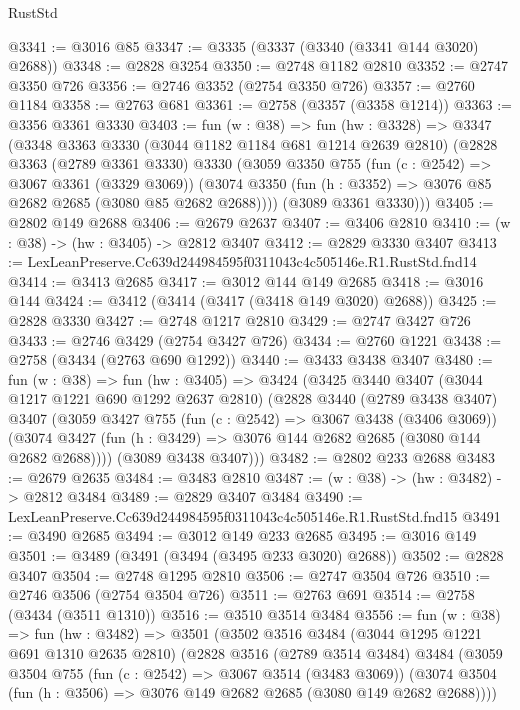 \begin{lexlean}{RustStd}
\begin{coremodule}
@3341 := @3016 @85
@3347 := @3335 (@3337 (@3340 (@3341 @144 @3020) @2688))
@3348 := @2828 @3254
@3350 := @2748 @1182 @2810
@3352 := @2747 @3350 @726
@3356 := @2746 @3352 (@2754 @3350 @726)
@3357 := @2760 @1184
@3358 := @2763 @681
@3361 := @2758 (@3357 (@3358 @1214))
@3363 := @3356 @3361 @3330
@3403 := fun (w : @38) =>
  fun (hw : @3328) =>
  @3347
    (@3348
      @3363
      @3330
      (@3044 @1182 @1184 @681 @1214 @2639 @2810)
      (@2828
        @3363
        (@2789 @3361 @3330)
        @3330
        (@3059
          @3350
          @755
          (fun (c : @2542) => @3067 @3361 (@3329 @3069))
          (@3074 @3350 (fun (h : @3352) => @3076 @85 @2682 @2685 (@3080 @85 @2682 @2688))))
        (@3089 @3361 @3330)))
@3405 := @2802 @149 @2688
@3406 := @2679 @2637
@3407 := @3406 @2810
@3410 := (w : @38) -> (hw : @3405) -> @2812 @3407
@3412 := @2829 @3330 @3407
@3413 := LexLeanPreserve.Cc639d244984595f0311043c4c505146e.R1.RustStd.fnd14
@3414 := @3413 @2685
@3417 := @3012 @144 @149 @2685
@3418 := @3016 @144
@3424 := @3412 (@3414 (@3417 (@3418 @149 @3020) @2688))
@3425 := @2828 @3330
@3427 := @2748 @1217 @2810
@3429 := @2747 @3427 @726
@3433 := @2746 @3429 (@2754 @3427 @726)
@3434 := @2760 @1221
@3438 := @2758 (@3434 (@2763 @690 @1292))
@3440 := @3433 @3438 @3407
@3480 := fun (w : @38) =>
  fun (hw : @3405) =>
  @3424
    (@3425
      @3440
      @3407
      (@3044 @1217 @1221 @690 @1292 @2637 @2810)
      (@2828
        @3440
        (@2789 @3438 @3407)
        @3407
        (@3059
          @3427
          @755
          (fun (c : @2542) => @3067 @3438 (@3406 @3069))
          (@3074 @3427 (fun (h : @3429) => @3076 @144 @2682 @2685 (@3080 @144 @2682 @2688))))
        (@3089 @3438 @3407)))
@3482 := @2802 @233 @2688
@3483 := @2679 @2635
@3484 := @3483 @2810
@3487 := (w : @38) -> (hw : @3482) -> @2812 @3484
@3489 := @2829 @3407 @3484
@3490 := LexLeanPreserve.Cc639d244984595f0311043c4c505146e.R1.RustStd.fnd15
@3491 := @3490 @2685
@3494 := @3012 @149 @233 @2685
@3495 := @3016 @149
@3501 := @3489 (@3491 (@3494 (@3495 @233 @3020) @2688))
@3502 := @2828 @3407
@3504 := @2748 @1295 @2810
@3506 := @2747 @3504 @726
@3510 := @2746 @3506 (@2754 @3504 @726)
@3511 := @2763 @691
@3514 := @2758 (@3434 (@3511 @1310))
@3516 := @3510 @3514 @3484
@3556 := fun (w : @38) =>
  fun (hw : @3482) =>
  @3501
    (@3502
      @3516
      @3484
      (@3044 @1295 @1221 @691 @1310 @2635 @2810)
      (@2828
        @3516
        (@2789 @3514 @3484)
        @3484
        (@3059
          @3504
          @755
          (fun (c : @2542) => @3067 @3514 (@3483 @3069))
          (@3074 @3504 (fun (h : @3506) => @3076 @149 @2682 @2685 (@3080 @149 @2682 @2688))))

\end{coremodule}
\end{lexlean}
